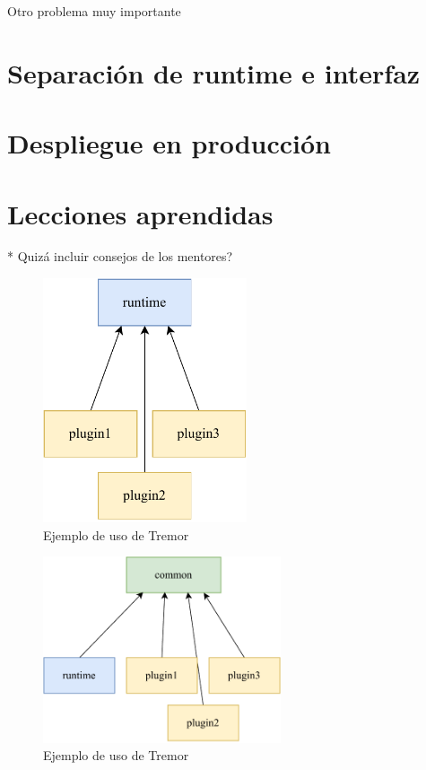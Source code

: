 Otro problema muy importante 

\section{Separación de runtime e interfaz}

\section{Despliegue en producción}

\section{Lecciones aprendidas}

* Quizá incluir consejos de los mentores?

\begin{figure}
    \centering
    \includegraphics[width=6cm]{./Imagenes/separation-temporary.pdf}
    \caption{Ejemplo de uso de Tremor}%
    \label{fig:separation_temporary}
\end{figure}

\begin{figure}
    \centering
    \includegraphics[width=7cm]{./Imagenes/separation.pdf}
    \caption{Ejemplo de uso de Tremor}%
    \label{fig:separation}
\end{figure}

